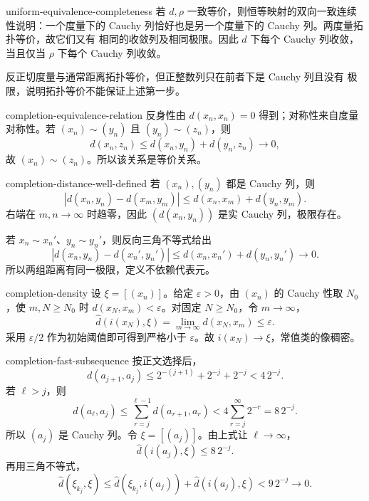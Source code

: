 \begin{solution}{uniform-equivalence-completeness}
若 \(d,\rho\) 一致等价，则恒等映射的双向一致连续性说明：一个度量下的
Cauchy 列恰好也是另一个度量下的 Cauchy 列。两度量拓扑等价，故它们又有
相同的收敛列及相同极限。因此 \(d\) 下每个 Cauchy 列收敛，当且仅当
\(\rho\) 下每个 Cauchy 列收敛。

反正切度量与通常距离拓扑等价，但正整数列只在前者下是 Cauchy 列且没有
极限，说明拓扑等价不能保证上述第一步。
\end{solution}

\begin{solution}{completion-equivalence-relation}
反身性由 \(d(x_n,x_n)=0\) 得到；对称性来自度量对称性。若
\((x_n)\sim(y_n)\) 且 \((y_n)\sim(z_n)\)，则
\[
 d(x_n,z_n)\le d(x_n,y_n)+d(y_n,z_n)\longrightarrow0,
\]
故 \((x_n)\sim(z_n)\)。所以该关系是等价关系。
\end{solution}

\begin{solution}{completion-distance-well-defined}
若 \((x_n),(y_n)\) 都是 Cauchy 列，则
\[
 |d(x_n,y_n)-d(x_m,y_m)|
 \le d(x_n,x_m)+d(y_n,y_m).
\]
右端在 \(m,n\to\infty\) 时趋零，因此 \((d(x_n,y_n))\) 是实 Cauchy
列，极限存在。

若 \(x_n\sim x_n'\)、\(y_n\sim y_n'\)，则反向三角不等式给出
\[
 |d(x_n,y_n)-d(x_n',y_n')|
 \le d(x_n,x_n')+d(y_n,y_n')\longrightarrow0.
\]
所以两组距离有同一极限，定义不依赖代表元。
\end{solution}

\begin{solution}{completion-density}
设 \(\xi=[(x_n)]\)。给定 \(\varepsilon>0\)，由 \((x_n)\) 的 Cauchy
性取 \(N_0\)，使 \(m,N\ge N_0\) 时
\(d(x_N,x_m)<\varepsilon\)。对固定 \(N\ge N_0\)，令 \(m\to\infty\)，
\[
 \widehat d(i(x_N),\xi)
 =\lim_{m\to\infty}d(x_N,x_m)\le\varepsilon.
\]
采用 \(\varepsilon/2\) 作为初始阈值即可得到严格小于
\(\varepsilon\)。故 \(i(x_N)\to\xi\)，常值类的像稠密。
\end{solution}

\begin{solution}{completion-fast-subsequence}
按正文选择后，
\[
 d(a_{j+1},a_j)
 \le2^{-(j+1)}+2^{-j}+2^{-j}<4\,2^{-j}.
\]
若 \(\ell>j\)，则
\[
 d(a_\ell,a_j)
 \le\sum_{r=j}^{\ell-1}d(a_{r+1},a_r)
 <4\sum_{r=j}^{\infty}2^{-r}=8\,2^{-j}.
\]
所以 \((a_j)\) 是 Cauchy 列。令 \(\xi=[(a_j)]\)。由上式让
\(\ell\to\infty\)，
\[
 \widehat d(i(a_j),\xi)\le8\,2^{-j}.
\]
再用三角不等式，
\[
 \widehat d(\xi_{k_j},\xi)
 \le\widehat d(\xi_{k_j},i(a_j))
   +\widehat d(i(a_j),\xi)
 <9\,2^{-j}\to0.
\]
\end{solution}

